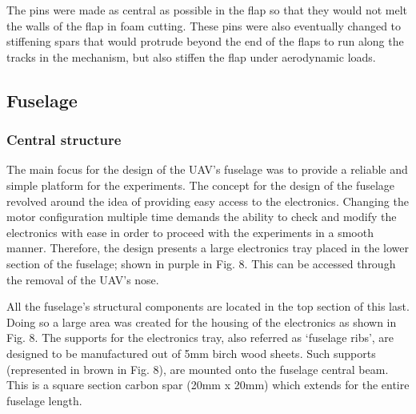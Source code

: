 \documentclass[../../main.tex]{subfiles}
\begin{document}

The pins were made as central as possible in the flap so that they would not melt the walls of the flap in foam cutting.
These pins were also eventually changed to stiffening spars that would protrude beyond the end of the flaps to run along the tracks in the mechanism, but also stiffen the flap under aerodynamic loads.


\subsection{Fuselage} \label{sec:design-process:final-design-proposal:fuselage}

\subsubsection{Central structure} \label{sec:design-process:final-design-proposal:fuselage:central-structure}

The main focus for the design of the UAV’s fuselage was to provide a reliable and simple platform for the experiments.
The concept for the design of the fuselage revolved around the idea of providing easy access to the electronics.
Changing the motor configuration multiple time demands the ability to check and modify the electronics with ease in order to proceed with the experiments in a smooth manner.
Therefore, the design presents a large electronics tray placed in the lower section of the fuselage; shown in purple in Fig. 8.
This can be accessed through the removal of the UAV’s nose.


All the fuselage’s structural components are located in the top section of this last.
Doing so a large area was created for the housing of the electronics as shown in Fig. 8.
The supports for the electronics tray, also referred as ‘fuselage ribs’, are designed to be manufactured out of 5mm birch wood sheets.
Such supports (represented in brown in Fig. 8), are mounted onto the fuselage central beam.
This is a square section carbon spar (20mm x 20mm) which extends for the entire fuselage length. 
\end{document}
